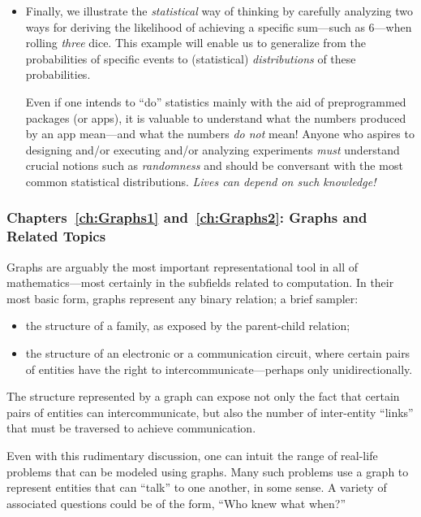 \begin{itemize}
\medskip\item
Finally, we illustrate the {\em statistical} way of thinking by carefully analyzing two ways for deriving the likelihood of achieving a specific sum---such as $6$---when rolling {\em three} dice.  This example will enable us to generalize from the probabilities of specific events to (statistical) {\it distributions} of these probabilities.

\smallskip

Even if one intends to ``do'' statistics mainly with the aid of preprogrammed packages (or apps), it is valuable to understand what the numbers produced by an app mean---and what the numbers {\em do not} mean!   Anyone who aspires to designing and/or executing and/or analyzing experiments {\em must} understand crucial notions such as {\em randomness} and should be conversant with the most common statistical distributions.  {\em Lives can depend on such knowledge!}
\end{itemize}

\subsubsection{Chapters~\ref{ch:Graphs1} and~\ref{ch:Graphs2}: Graphs and Related Topics}

Graphs are arguably the most important representational tool in all of mathematics---most certainly in the subfields related to computation.  In their most basic form, graphs represent any binary relation; a brief sampler:
\begin{itemize}
\item
the structure of a family, as exposed by the parent-child relation;
\medskip\item
the structure of an electronic or a communication circuit, where certain pairs of entities have the right to intercommunicate---perhaps only unidirectionally.
\end{itemize}
The structure represented by a graph can expose not only the fact that certain pairs of entities can intercommunicate, but also the number of inter-entity ``links'' that must be traversed to achieve communication.

\smallskip

Even with this rudimentary discussion, one can intuit the range of real-life problems that can be modeled using graphs.  Many such problems use a graph to represent entities that can ``talk'' to one another, in some sense.  A variety of associated questions could be of the form, ``Who knew what when?''


